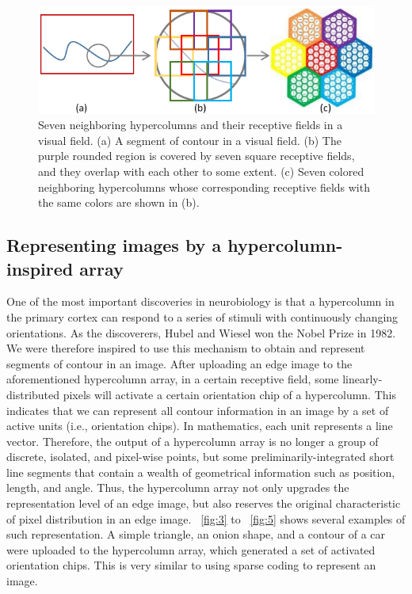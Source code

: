 \documentclass[journal]{IEEEtran}
\begin{document}
\begin{figure}[!t]
\centering
\includegraphics[width=\linewidth]{images/fig2.pdf}
\caption{Seven neighboring hypercolumns and their receptive fields in a visual field. 
(a) A segment of contour in a visual field. 
(b) The purple rounded region is covered by seven square receptive fields, 
and they overlap with each other to some extent. 
(c) Seven colored neighboring hypercolumns whose corresponding receptive fields with the same colors 
are shown in (b).}
\label{fig:2}
\end{figure}

\subsection{Representing images by a hypercolumn-inspired array}

One of the most important discoveries in neurobiology is that a hypercolumn in the primary cortex can respond to a series of stimuli with continuously changing orientations. 
As the discoverers, Hubel and Wiesel won the Nobel Prize in 1982. 
We were therefore inspired to use this mechanism to obtain and represent segments of contour in an image. 
After uploading an edge image to the aforementioned hypercolumn array, 
in a certain receptive field, 
some linearly-distributed pixels will activate a certain orientation chip of a hypercolumn. 
This indicates that we can represent all contour information in an image by a set of active units (i.e., orientation chips). In mathematics, each unit represents a line vector. Therefore, the output of a hypercolumn array is no longer a group of discrete, isolated, and pixel-wise points, 
but some preliminarily-integrated short line segments that contain a wealth of geometrical information such as position, length, and angle. 
Thus, the hypercolumn array not only upgrades the representation level of an edge image, 
but also reserves the original characteristic of pixel distribution in an edge image. 
\figurename~\ref{fig:3} to \figurename~\ref{fig:5} shows several examples of such representation.
A simple triangle, an onion shape, and a contour of a car were uploaded to the hypercolumn array,
which generated a set of activated orientation chips.
This is very similar to using sparse coding to represent an image.
\end{document}
